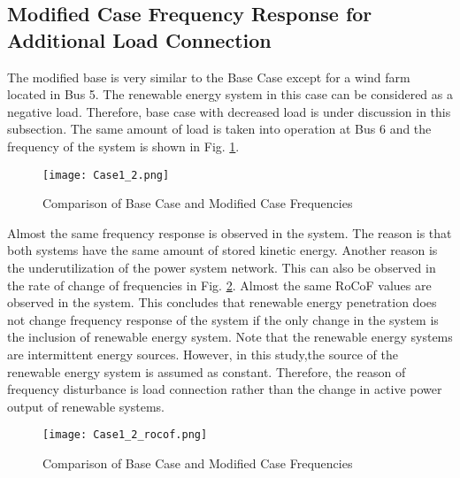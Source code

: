 \subsection{Modified Case Frequency Response for Additional Load Connection}
The modified base is very similar to the Base Case except for a wind farm located in Bus 5. The renewable energy system in this case can be considered as a negative load. Therefore, base case with decreased load is under discussion in this subsection. The same amount of load is taken into operation at Bus 6 and the frequency of the system is shown in Fig. \ref{Case1_2_freq}.\\
\begin{figure}[h!]
	\centering
	\texttt{[image: Case1\_2.png]}
	\caption{Comparison of Base Case and Modified Case Frequencies}
	\label{Case1_2_freq}
\end{figure}
Almost the same frequency response is observed in the system. The reason is that both systems have the same amount of stored kinetic energy. Another reason is the underutilization of the power system network. This can also be observed in the rate of change of frequencies in Fig. \ref{Case1_2_rocof}. Almost the same RoCoF values are observed in the system. This concludes that renewable energy penetration does not change frequency response of the system if the only change in the system is the inclusion of renewable energy system. Note that the renewable energy systems are intermittent energy sources. However, in this study,the source of the renewable energy system is assumed as constant. Therefore, the reason of frequency disturbance is load connection rather than the change in active power output of renewable systems.
\begin{figure}[h!]
	\centering
	\texttt{[image: Case1\_2\_rocof.png]}
	\caption{Comparison of Base Case and Modified Case Frequencies}
	\label{Case1_2_rocof}
\end{figure}
